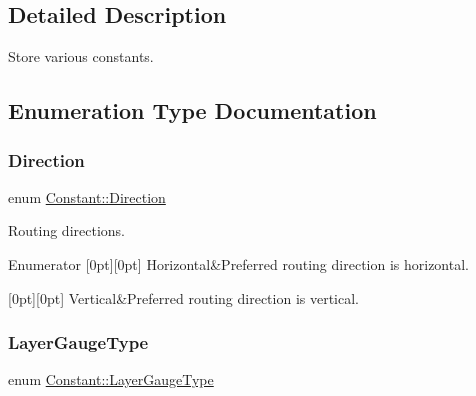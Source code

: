 \subsection{Detailed Description}
Store various constants. 

\subsection{Enumeration Type Documentation}
\mbox{\label{namespaceConstant_ac081a99f2b64361919ed5d9f37c0f9af}} 
\subsubsection{\texorpdfstring{Direction}{Direction}}
{\footnotesize\ttfamily enum \mbox{\hyperlink{namespaceConstant_ac081a99f2b64361919ed5d9f37c0f9af}{Constant\+::\+Direction}}}

Routing directions. \begin{DoxyEnumFields}{Enumerator}
[0pt][0pt]{}\mbox{\label{namespaceConstant_ac081a99f2b64361919ed5d9f37c0f9afa7a545ff2d744fe30bfac294dfe9d03db}} 
Horizontal&Preferred routing direction is horizontal. \\
\hline

[0pt][0pt]{}\mbox{\label{namespaceConstant_ac081a99f2b64361919ed5d9f37c0f9afa63ce9cc57c99cccca96aa1157113da34}} 
Vertical&Preferred routing direction is vertical. \\
\hline

\end{DoxyEnumFields}
\mbox{\label{namespaceConstant_ab2e46a17cc373a268c5c24fa0e2067e5}} 
\subsubsection{\texorpdfstring{Layer\+Gauge\+Type}{LayerGaugeType}}
{\footnotesize\ttfamily enum \mbox{\hyperlink{namespaceConstant_ab2e46a17cc373a268c5c24fa0e2067e5}{Constant\+::\+Layer\+Gauge\+Type}}}

